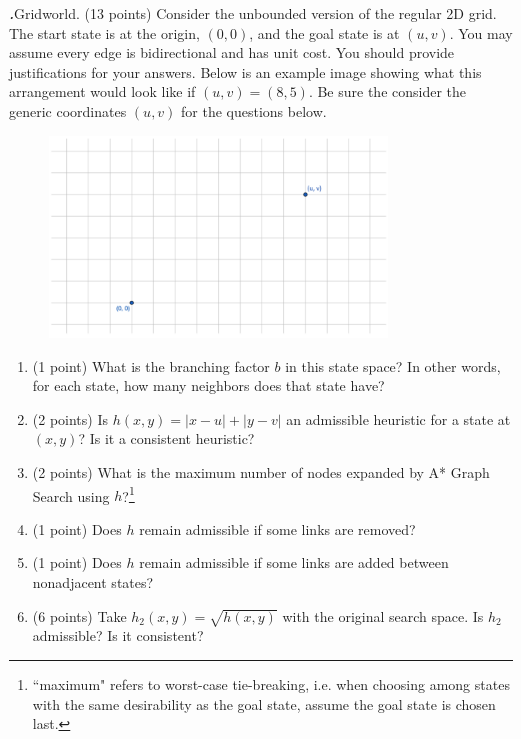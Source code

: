 \documentclass[12pt]{amsart}
\newenvironment{statement}[1]{\smallskip\noindent\color[rgb]{0.0,0.0,0.0} {\bf #1.}}{}
\theoremstyle{definition}
\theoremstyle{remark}
\newcommand{\1}{\mathds{1}}
\begin{document}
\newpage
\begin{statement}{2} 
\emph{Gridworld.} (13 points) Consider the unbounded version of the regular 2D grid. The start state is at the origin, $(0,0)$, and the goal state is at $(u, v)$. You may assume every edge is bidirectional and has unit cost. You should provide justifications for your answers. Below is an example image showing what this arrangement would look like if $(u, v) = (8,5)$. Be sure the consider the generic coordinates $(u, v)$ for the questions below.
\begin{figure}[H]
    \centering
    \includegraphics[width=0.8\textwidth]{images/2d_grid_new.png}
\end{figure}

\begin{enumerate}
    \item (1 point) What is the branching factor $b$ in this state space? In other words, for each state, how many neighbors does that state have? 
    \item (2 points) Is $h(x,y) = |x - u| + |y - v|$ an admissible heuristic for a state at $(x, y)$? Is it a consistent heuristic?
    \item (2 points) What is the maximum number of nodes expanded by A* Graph Search using $h$?\footnote{\label{max}``maximum" refers to worst-case tie-breaking, i.e. when choosing among states with the same desirability as the goal state, assume the goal state is chosen last.}
    \item (1 point) Does $h$ remain admissible if some links are removed?
    \item (1 point) Does $h$ remain admissible if some links are added between nonadjacent states? %
    \item (6 points) Take $h_2(x,y) = \sqrt{h(x,y)}$ with the original search space. Is $h_2$ admissible? Is it consistent?
\end{enumerate}
\end{statement}
\end{document}
